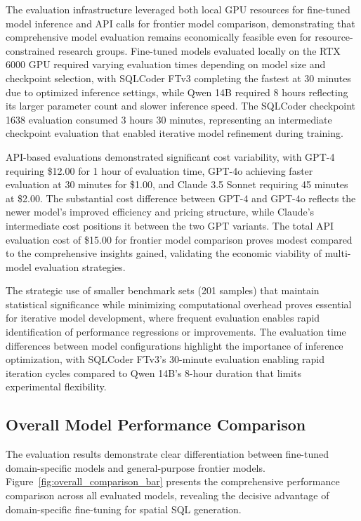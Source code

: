 The evaluation infrastructure leveraged both local GPU resources for fine-tuned model inference and API calls for frontier model comparison, demonstrating that comprehensive model evaluation remains economically feasible even for resource-constrained research groups. Fine-tuned models evaluated locally on the RTX 6000 GPU required varying evaluation times depending on model size and checkpoint selection, with SQLCoder FTv3 completing the fastest at 30 minutes due to optimized inference settings, while Qwen 14B required 8 hours reflecting its larger parameter count and slower inference speed. The SQLCoder checkpoint 1638 evaluation consumed 3 hours 30 minutes, representing an intermediate checkpoint evaluation that enabled iterative model refinement during training.

API-based evaluations demonstrated significant cost variability, with GPT-4 requiring \$12.00 for 1 hour of evaluation time, GPT-4o achieving faster evaluation at 30 minutes for \$1.00, and Claude 3.5 Sonnet requiring 45 minutes at \$2.00. The substantial cost difference between GPT-4 and GPT-4o reflects the newer model's improved efficiency and pricing structure, while Claude's intermediate cost positions it between the two GPT variants. The total API evaluation cost of \$15.00 for frontier model comparison proves modest compared to the comprehensive insights gained, validating the economic viability of multi-model evaluation strategies.

The strategic use of smaller benchmark sets (201 samples) that maintain statistical significance while minimizing computational overhead proves essential for iterative model development, where frequent evaluation enables rapid identification of performance regressions or improvements. The evaluation time differences between model configurations highlight the importance of inference optimization, with SQLCoder FTv3's 30-minute evaluation enabling rapid iteration cycles compared to Qwen 14B's 8-hour duration that limits experimental flexibility.

\subsection{Overall Model Performance Comparison}

The evaluation results demonstrate clear differentiation between fine-tuned domain-specific models and general-purpose frontier models. Figure~\ref{fig:overall_comparison_bar} presents the comprehensive performance comparison across all evaluated models, revealing the decisive advantage of domain-specific fine-tuning for spatial SQL generation.

